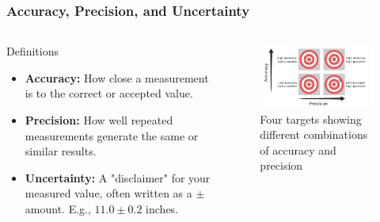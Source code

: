 \documentclass{beamer}
\begin{document}
\begin{frame}
    \frametitle{Accuracy, Precision, and Uncertainty}
    \begin{columns}
        \begin{column}{0.5\textwidth}
            \begin{block}{Definitions}
                \begin{itemize}
                    \item \textbf{Accuracy:} How close a measurement is to the correct or accepted value.
                    \pause
                    \item \textbf{Precision:} How well repeated measurements generate the same or similar results.
                    \pause
                    \item \textbf{Uncertainty:} A "disclaimer" for your measured value, often written as a \(\pm\) amount. E.g., \(11.0 \pm 0.2\) inches.
                \end{itemize}
            \end{block}
        \end{column}
        \begin{column}{0.5\textwidth}
            \begin{figure}
    \centering
    \includegraphics[width=0.8\linewidth]{phys11-accuracy-precision-targets.png}
    \caption{Four targets showing different combinations of accuracy and precision}
\end{figure}
        \end{column}
    \end{columns}
\end{frame}
\end{document}
